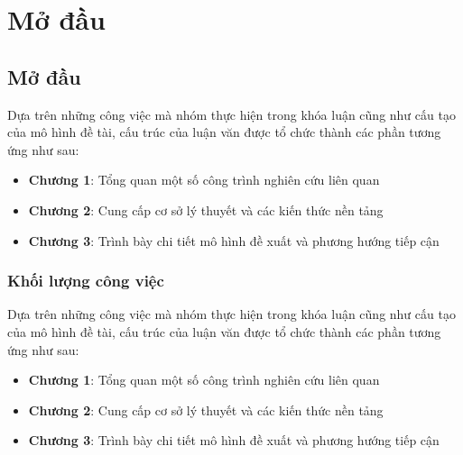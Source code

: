 \chapter*{\centering Mở đầu}

\section{Mở đầu}
Dựa trên những công việc mà nhóm thực hiện trong khóa luận cũng như cấu tạo của mô hình đề tài, cấu trúc của luận văn được tổ chức thành các phần tương ứng như sau:
\begin{itemize}
    \item {\bf Chương 1}: Tổng quan một số công trình nghiên cứu liên quan
    \item {\bf Chương 2}: Cung cấp cơ sở lý thuyết và các kiến thức nền tảng
    \item {\bf Chương 3}: Trình bày chi tiết mô hình đề xuất và phương hướng tiếp cận
\end{itemize}

\subsection{Khối lượng công việc}
Dựa trên những công việc mà nhóm thực hiện trong khóa luận cũng như cấu tạo của mô hình đề tài, cấu trúc của luận văn được tổ chức thành các phần tương ứng như sau:
\begin{itemize}[noitemsep, leftmargin=2.5cm]
    \item {\bf Chương 1}: Tổng quan một số công trình nghiên cứu liên quan
    \item {\bf Chương 2}: Cung cấp cơ sở lý thuyết và các kiến thức nền tảng
    \item {\bf Chương 3}: Trình bày chi tiết mô hình đề xuất và phương hướng tiếp cận
\end{itemize}

\newpage